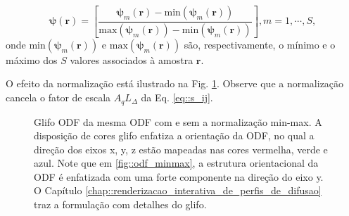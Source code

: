 \documentclass[
    12pt,                %
    oneside,            %
    a4paper,            %
    english,            %
    french,                %
    spanish,            %
    brazil                %
    ]{abntex2}
\begin{document}
\begin{equation}
\label{eq::SDF2dODF}
    \boldsymbol{\psi}(\mathbf{r}) = [ \frac{\boldsymbol{\psi}_m(\mathbf{r}) - \text{min}(\boldsymbol{\psi}_m(\mathbf{r}))}{\text{max}(\boldsymbol{\psi}_m(\mathbf{r})) - \text{min}(\boldsymbol{\psi}_m(\mathbf{r}))}], m = 1, \cdots, S ,
\end{equation}
onde $\text{min}(\boldsymbol{\psi}_m(\mathbf{r}))$ e $\text{max}(\boldsymbol{\psi}_m(\mathbf{r}))$ são, respectivamente, o mínimo e o máximo dos $S$ valores associados à amostra $\mathbf{r}$.

O efeito da normalização está ilustrado na Fig. \ref{fig::normalizacao_min_max}. Observe que a normalização cancela o fator de escala $A_qL_{\Delta}$ da Eq. \ref{eq::s_ij}.


\begin{figure}[ht]
\centering
\captionsetup[subfloat]{farskip=0pt,nearskip=0pt}
\centering
    \hspace{1em}
     \caption{Glifo ODF da mesma ODF com e sem a normalização min-max. A disposição de cores glifo enfatiza a orientação da ODF, no qual a direção dos eixos x, y, z estão mapeadas nas cores vermelha, verde e azul. Note que em \ref{fig::odf_minmax}, a estrutura orientacional da ODF é enfatizada com uma forte componente na direção do eixo y. O Capítulo \ref{chap::renderizacao_interativa_de_perfis_de_difusao} traz a formulação com detalhes do glifo.}
    \label{fig::normalizacao_min_max}
\end{figure}
\end{document}
